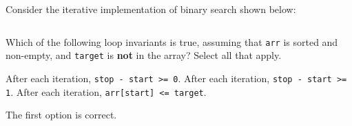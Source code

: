 \begin{prob}
    Consider the iterative implementation of binary search shown below:
    \inputminted{python}{./code.py}

    Which of the following loop invariants is true, assuming that
    \texttt{arr} is sorted and non-empty, and \texttt{target} is \textbf{not} in the array? Select all that apply.

    \begin{choices}[rectangle]
        \correctchoice  After each iteration, \texttt{stop - start >= 0}.
        \choice  After each iteration, \texttt{stop - start >= 1}.
        \choice  After each iteration, \texttt{arr[start] <= target}.
    \end{choices}

    \begin{soln}
        The first option is correct.
    \end{soln}
\end{prob}
